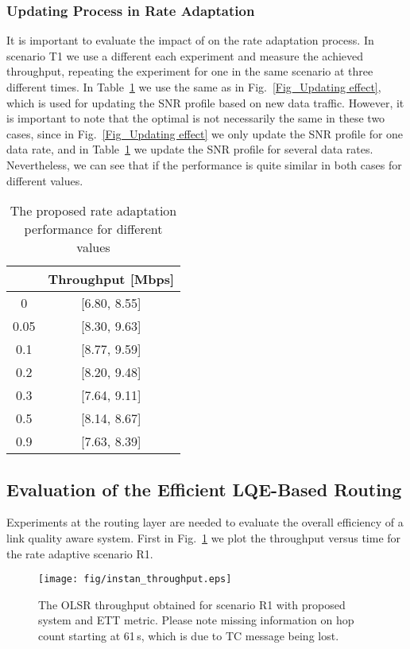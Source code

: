 \documentclass[11pt,draftclsnofoot,journal,onecolumn]{IEEEtran}
\begin{document}
\subsubsection{Updating Process in Rate Adaptation}
\label{sec:rate_updating_based}

It is important to evaluate the impact of  on the rate adaptation process. In scenario T1 we use a different  each experiment and measure the achieved throughput,  repeating the experiment for one  in the same scenario at three different times. In Table~\ref{Tab_alpha_value} we use the same  as in Fig.~\ref{Fig_Updating effect}, which is used for updating the SNR profile based on new data traffic. However, it is important to note that the optimal  is not necessarily the same in these two cases, since in Fig.~\ref{Fig_Updating effect} we only update the SNR profile for one data rate, and in Table~\ref{Tab_alpha_value} we update the SNR profile for several data rates. Nevertheless, we can see that if  the performance is quite similar in both cases for different  values.

\begin{table}
\centering
\caption{The proposed rate adaptation performance for different  values}
\label{Tab_alpha_value}
\begin{tabular}{c|c}
\hline
 & Throughput [Mbps]\\
\hline\hline
0 & [6.80, 8.55]\\
0.05 & [8.30, 9.63]\\
0.1 & [8.77, 9.59]\\
0.2 & [8.20, 9.48]\\
0.3 & [7.64, 9.11]\\
0.5 & [8.14, 8.67]\\
0.9 & [7.63, 8.39]\\
\hline
\end{tabular}
\end{table}

\subsection{Evaluation of the Efficient LQE-Based Routing}
\label{sec:result_routing_improvement}

Experiments at the routing layer are needed to evaluate the overall
efficiency of a link quality aware system. First in
Fig.~\ref{Fig_result_route_mobile_instan} we plot the throughput
versus time for the rate adaptive scenario R1.
\begin{figure}
\centering
\texttt{[image: fig/instan\_throughput.eps]}
\caption{The OLSR throughput obtained for scenario R1 with proposed system and ETT metric. Please note missing information on hop count starting at 61\,s, which is due to TC message being lost.}
\label{Fig_result_route_mobile_instan}
\end{figure}
\end{document}
